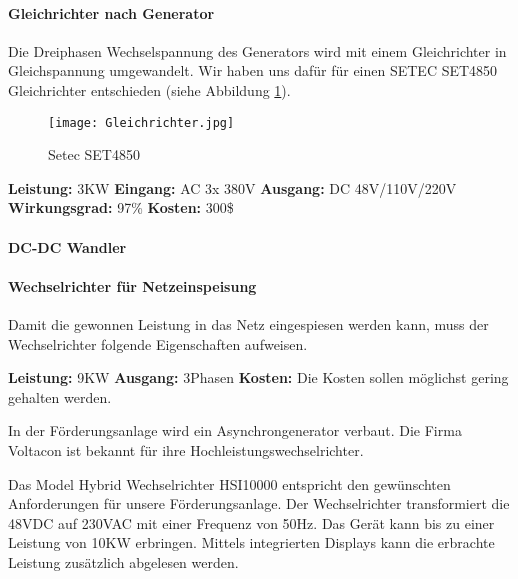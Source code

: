 \paragraph{Gleichrichter nach Generator}

Die Dreiphasen Wechselspannung des Generators wird mit einem Gleichrichter in Gleichspannung umgewandelt. Wir haben uns dafür für einen SETEC SET4850 Gleichrichter entschieden (siehe Abbildung \ref{fig:Gleichrichter}). 


\begin{figure}[H]
\centering
\texttt{[image: Gleichrichter.jpg]}
\caption{Setec SET4850 \cite{gleichrichter}}
\label{fig:Gleichrichter}
\end{figure}

\textbf{Leistung:}		3KW \newline
\textbf{Eingang:}		AC 3x 380V \newline
\textbf{Ausgang:}		DC 48V/110V/220V \newline
\textbf{Wirkungsgrad:}	97\% \newline
\textbf{Kosten:}		300\$ \newline


\paragraph{DC-DC Wandler}

\paragraph{Wechselrichter für Netzeinspeisung} \label{par:WechselrichterNetz}

Damit die gewonnen Leistung in das Netz eingespiesen werden kann, muss der Wechselrichter folgende Eigenschaften aufweisen. 

\textbf{Leistung:}		9KW \newline
\textbf{Ausgang:}		3Phasen \newline
\textbf{Kosten:}		Die Kosten sollen möglichst gering gehalten werden. \newline

In der Förderungsanlage wird ein Asynchrongenerator verbaut. Die Firma Voltacon ist bekannt für ihre Hochleistungswechselrichter.

Das Model Hybrid Wechselrichter HSI10000 entspricht den gewünschten Anforderungen für unsere Förderungsanlage. Der Wechselrichter transformiert die 48VDC auf 230VAC mit einer Frequenz von 50\si{\hertz}. Das Gerät kann bis zu einer Leistung von 10KW erbringen. Mittels integrierten Displays kann die erbrachte Leistung zusätzlich abgelesen werden. 

